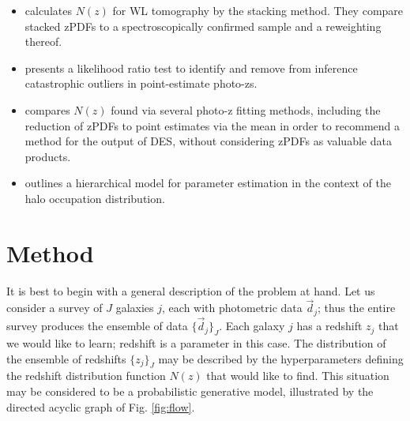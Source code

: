\documentclass[preprint]{aastex}
\begin{document}
\begin{itemize}
\item \citet{ben12} calculates $N(z)$ for WL tomography by the stacking method.  They compare stacked zPDFs to a spectroscopically confirmed sample and a reweighting thereof.
\item \citet{gor13} presents a likelihood ratio test to identify and remove from inference catastrophic outliers in point-estimate photo-zs.
\item \citet{bon15} compares $N(z)$ found via several photo-z fitting methods, including the reduction of zPDFs to point estimates via the mean in order to recommend a method for the output of DES, without considering zPDFs as valuable data products.
\item \citet{mar15} outlines a hierarchical model for parameter estimation in the context of the halo occupation distribution.
\end{itemize}

\section{Method}
\label{sec:meth}

It is best to begin with a general description of the problem at hand.  Let us consider a survey of $J$ galaxies $j$, each with photometric data $\vec{d}_{j}$; thus the entire survey produces the ensemble of data $\{\vec{d}_{j}\}_{J}$.  Each galaxy $j$ has a redshift $z_{j}$ that we would like to learn; redshift is a parameter in this case.  The distribution of the ensemble of redshifts $\{z_{j}\}_{J}$ may be described by the hyperparameters defining the redshift distribution function $N(z)$ that would like to find.  This situation may be considered to be a probabilistic generative model, illustrated by the directed acyclic graph of Fig. \ref{fig:flow}.  
\end{document}
